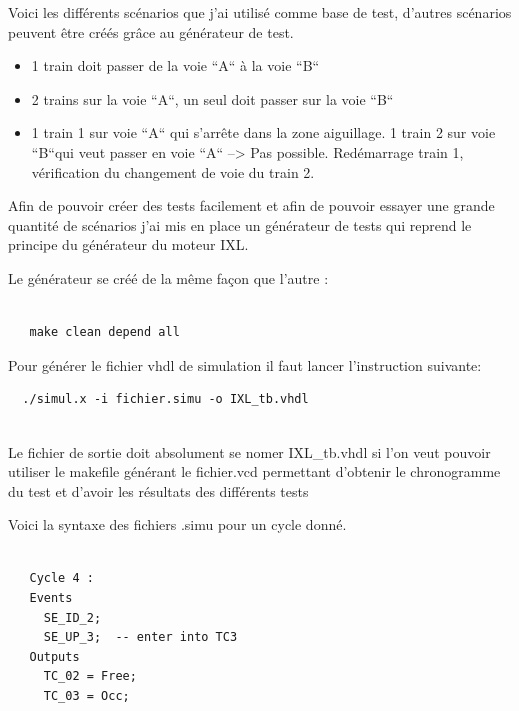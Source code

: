 Voici les différents scénarios que j'ai utilisé comme base de test,
d'autres scénarios peuvent être créés  grâce au générateur de test.

\medskip

\begin{itemize}
    \item 1 train doit passer de la voie ``A`` à la voie ``B``
    \item 2 trains sur la voie ``A``, un seul doit passer sur la voie ``B``
    \item 1 train 1 sur voie ``A`` qui s'arrête dans la zone aiguillage.
          1 train 2 sur voie ``B``qui veut passer en voie ``A`` --> Pas
          possible. Red\'emarrage train 1, v\'erification du
          changement  de voie du train 2.
\end{itemize}

\medskip

Afin de pouvoir créer des tests facilement et afin de pouvoir essayer une
grande quantité de scénarios j'ai mis en place un générateur de tests
qui reprend le principe du générateur du moteur IXL.

\smallskip

Le générateur se créé de la même façon que l'autre :

\begin{lstlisting}

   make clean depend all

\end{lstlisting}
  
\newpage

Pour générer le fichier vhdl de simulation il faut lancer l'instruction suivante:
\begin{lstlisting}
  ./simul.x -i fichier.simu -o IXL_tb.vhdl
  
\end{lstlisting}

\medskip

Le fichier de sortie doit absolument se nomer IXL\_tb.vhdl si l'on
veut pouvoir utiliser le makefile générant le fichier.vcd permettant
d'obtenir le chronogramme du test et d'avoir les résultats des
différents tests

\medskip

Voici la syntaxe des fichiers .simu pour un cycle donné.

\begin{lstlisting}

   Cycle 4 :
   Events
     SE_ID_2;  
     SE_UP_3;  -- enter into TC3	
   Outputs
     TC_02 = Free;
     TC_03 = Occ;  

\end{lstlisting}

